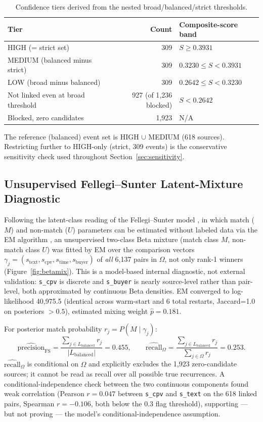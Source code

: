 \documentclass[11pt]{article}
\begin{document}
\begin{table}[h!]
\centering
\caption{Confidence tiers derived from the nested broad/balanced/strict
thresholds.}
\label{tab:tiers}
\begin{tabular}{lrl}
\toprule
Tier & Count & Composite-score band \\
\midrule
HIGH (= strict set) & 309 & $S \geq 0.3931$ \\
MEDIUM (balanced minus strict) & 309 & $0.3230 \leq S < 0.3931$ \\
LOW (broad minus balanced) & 309 & $0.2642 \leq S < 0.3230$ \\
\midrule
Not linked even at broad threshold & 927 (of 1{,}236 blocked) & $S < 0.2642$ \\
Blocked, zero candidates & 1{,}923 & N/A \\
\bottomrule
\end{tabular}
\end{table}
The reference (balanced) event set is HIGH $\cup$ MEDIUM (618 sources).
Restricting further to HIGH-only (strict, 309 events) is the conservative
sensitivity check used throughout Section~\ref{sec:sensitivity}.

\subsection{Unsupervised Fellegi--Sunter Latent-Mixture Diagnostic}
\label{sec:fs}
Following the latent-class reading of the Fellegi--Sunter model
\cite{fellegi1969}, in which match ($M$) and non-match ($U$) parameters can
be estimated without labeled data via the EM algorithm
\cite{dempster1977,winkler1988}, an unsupervised two-class Beta mixture
(match class $M$, non-match class $U$) was fitted by EM over the comparison
vectors
$\gamma_j=(s_{\text{text}},s_{\text{cpv}},s_{\text{time}},s_{\text{buyer}})$
of \emph{all} 6{,}137 pairs in $\Omega$, not only rank-1 winners
(Figure~\ref{fig:betamix}). This is a model-based internal diagnostic, not
external validation: \texttt{s\_cpv} is discrete and \texttt{s\_buyer} is
nearly source-level rather than pair-level, both approximated by continuous
Beta densities. EM converged to log-likelihood 40{,}975.5 (identical across
warm-start and 6 total restarts, Jaccard=1.0 on posteriors $>0.5$),
estimated mixing weight $\hat p = 0.181$.

For posterior match probability $r_j = P(M \mid \gamma_j)$:
\begin{equation}
\widehat{\text{precision}}_{\text{FS}} = \frac{\sum_{j \in L_{\text{balanced}}} r_j}{|L_{\text{balanced}}|} = 0.455,
\qquad
\widehat{\text{recall}}_\Omega = \frac{\sum_{j \in L_{\text{balanced}}} r_j}{\sum_{j \in \Omega} r_j} = 0.253.
\end{equation}
$\widehat{\text{recall}}_\Omega$ is conditional on $\Omega$ and explicitly
excludes the 1{,}923 zero-candidate sources; it cannot be read as recall
over all possible true recurrences. A conditional-independence check between
the two continuous components found weak correlation (Pearson
$r=0.047$ between \texttt{s\_cpv} and \texttt{s\_text} on the 618 linked
pairs, Spearman $r=-0.106$, both below the 0.3 flag threshold), supporting
--- but not proving --- the model's conditional-independence assumption.
\end{document}
